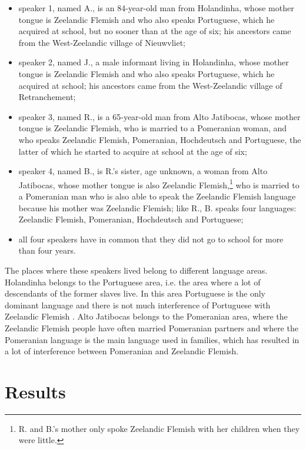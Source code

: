 \documentclass[output=paper,hidelinks,draftmode]{langscibook}
\begin{document}
\begin{itemize}
\item speaker 1, named A., is an 84-year-old man from Holandinha, whose mother tongue is Zeelandic Flemish and who also speaks Portuguese, which he acquired at school, but no sooner than at the age of six; his ancestors came from the West-Zeelandic village of Nieuwvliet;
\item speaker 2, named J., a male informant living in Holandinha, whose mother tongue is Zeelandic Flemish and who also speaks Portuguese, which he acquired at school; his ancestors came from the West-Zeelandic village of Retranchement;
\item speaker 3, named R., is a 65-year-old man from Alto Jatibocas, whose mother tongue is Zeelandic Flemish, who is married to a Pomeranian woman, and who speaks Zeelandic Flemish, Pomeranian, Hochdeutsch and Portuguese, the latter of which he started to acquire at school at the age of six;
\item speaker 4, named B., is R.’s sister, age unknown, a woman from Alto Jatibocas, whose mother tongue is also Zeelandic Flemish,\footnote{R. and B.’s mother only spoke Zeelandic Flemish with her children when they were little.} who is married to a Pomeranian man who is also able to speak the Zeelandic Flemish language because his mother was Zeelandic Flemish; like R., B. speaks four languages: Zeelandic Flemish, Pomeranian, Hochdeutsch and Portuguese;
\item all four speakers have in common that they did not go to school for more than four years.
\end{itemize}

The places where these speakers lived belong to different language areas. Ho\-lan\-dinha belongs to the Portuguese area, i.e. the area where a lot of descendants of the former slaves live. In this area Portuguese is the only dominant language and there is not much interference of Portuguese with Zeelandic Flemish \citep{SchaffelBremenkampPostma2017}. Alto Jatibocas belongs to the Pomeranian area, where the Zeelandic Flemish people have often married Pomeranian partners and where the Pomeranian language is the main language used in families, which has resulted in a lot of interference between Pomeranian and Zeelandic Flemish.

\section{Results}
\end{document}
